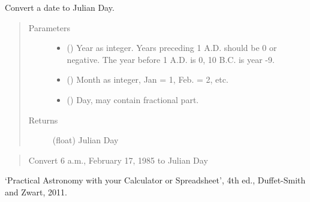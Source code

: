 \documentclass[letterpaper,10pt,english]{sphinxmanual}
\begin{document}
\begin{fulllineitems}
\label{\detokenize{modules/dpt_tools:dpt_tools.date_to_jd}}
Convert a date to Julian Day.
\begin{quote}\begin{description}
\item[{Parameters}] \leavevmode\begin{itemize}
\item {} 
 () \textendash{} Year as integer. Years preceding 1 A.D. should be 0 or negative. The year before 1 A.D. is 0, 10 B.C. is year -9.

\item {} 
 () \textendash{} Month as integer, Jan = 1, Feb. = 2, etc.

\item {} 
 () \textendash{} Day, may contain fractional part.

\end{itemize}

\item[{Returns}] \leavevmode
(float) Julian Day

\end{description}\end{quote}

\begin{quote}

Convert 6 a.m., February 17, 1985 to Julian Day

%
\begin{sphinxVerbatim}[commandchars=\\\{\}]
\end{sphinxVerbatim}
\end{quote}

 ‘Practical Astronomy with your Calculator or Spreadsheet’, 4th ed., Duffet-Smith and Zwart, 2011.

\end{fulllineitems}
\end{document}

